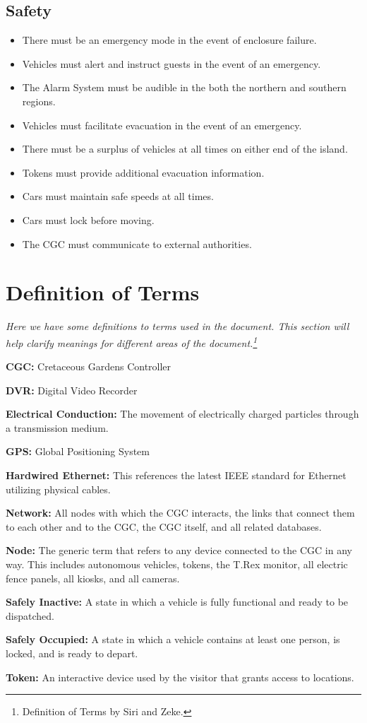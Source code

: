 \documentclass[12pt]{article}
\begin{document}
	\subsection{Safety}
	\begin{itemize}
		\item There must be an emergency mode in the event of enclosure failure.
		\item Vehicles must alert and instruct guests in the event of an emergency.
		\item The Alarm System must be audible in the both the northern and southern regions.
		\item Vehicles must facilitate evacuation in the event of an emergency.
		\item There must be a surplus of vehicles at all times on either end of the island.
		\item Tokens must provide additional evacuation information.
		\item Cars must maintain safe speeds at all times.
		\item Cars must lock before moving.
		\item The CGC must communicate to external authorities.
	\end{itemize}

\section{Definition of Terms}
\label{def}
\textit{Here we have some definitions to terms used in the document. This section will help clarify meanings for different 
areas of the document.\footnote {Definition of Terms by Siri and Zeke.}}
\begin{list}{}{}
	\item \textbf{CGC:} Cretaceous Gardens Controller 
	\item \textbf{DVR:} Digital Video Recorder
	\item \textbf{Electrical Conduction:} The movement of electrically charged particles through a transmission medium.
	\item \textbf{GPS:} Global Positioning System 
	\item \textbf{Hardwired Ethernet:} This references the latest IEEE standard for Ethernet utilizing physical cables.
	\item \textbf{Network:} All nodes with which the CGC interacts, the links that connect them to each other and to the
	CGC, the CGC itself, and all related databases.
	\item \textbf{Node:} The generic term that refers to any device connected to the CGC in any way. This includes 
	autonomous vehicles, tokens, the T.Rex monitor, all electric fence panels, all kiosks, and all cameras.
	\item \textbf{Safely Inactive:} A state in which a vehicle is fully functional and ready to be dispatched.
	\item \textbf{Safely Occupied:} A state in which a vehicle contains at least one person, is locked, and is ready to depart.
	\item \textbf{Token:} An interactive device used by the visitor that grants access to locations.
\end{list}


\end{document}
